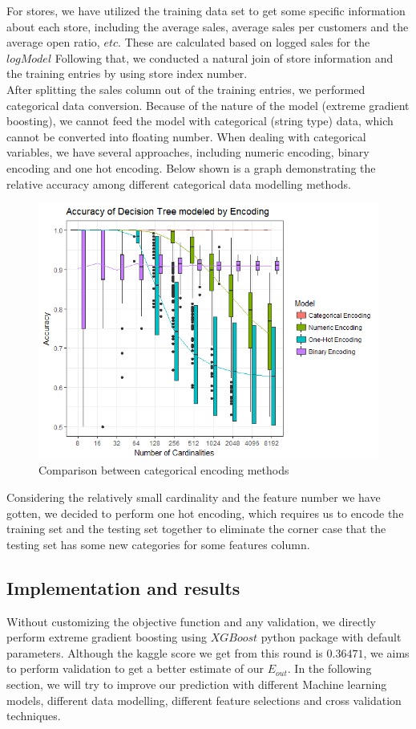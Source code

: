 \documentclass{article}
\begin{document}
For stores, we have utilized the training data set to get some specific information about each store, including the average sales, average sales per customers and the average open ratio, $etc$. These are calculated based on logged sales for the $log Model$ Following that, we conducted a natural join of store information and the training entries by using store index number.\\

After splitting the sales column out of the training entries, we performed categorical data conversion. Because of the nature of the model (extreme gradient boosting), we cannot feed the model with categorical (string type) data, which cannot be converted into floating number. When dealing with categorical variables, we have several approaches, including numeric encoding, binary encoding and one hot encoding. Below shown is a graph demonstrating the relative accuracy among different categorical data modelling methods.

\begin{figure}[h]
	\centering
	\includegraphics[scale=0.30]{categorical_encoding.png}
	\caption{Comparison between categorical encoding methods}
\end{figure}

Considering the relatively small cardinality and the feature number we have gotten, we decided to perform one hot encoding, which requires us to encode the training set and the testing set together to eliminate the corner case that the testing set has some new categories for some features column.

\subsection{Implementation and results}
Without customizing the objective function and any validation, we directly perform extreme gradient boosting using $XGBoost$ python package with default parameters. Although the kaggle score we get from this round is $0.36471$, we aims to perform validation to get a better estimate of our $E_{out}$. In the following section, we will try to improve our prediction with different Machine learning models, different data modelling, different feature selections and cross validation techniques.
\end{document}
